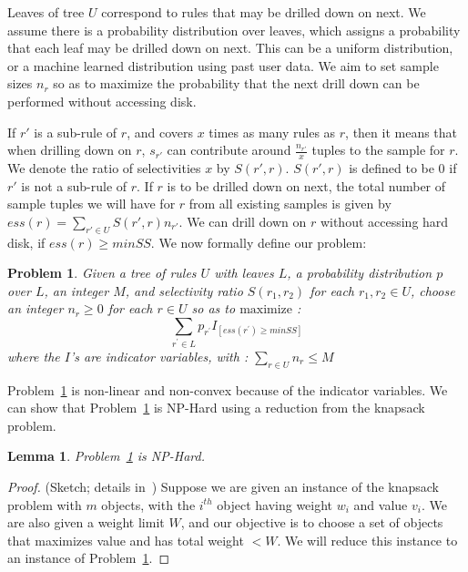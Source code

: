 \documentclass[10pt,journal,compsoc]{IEEEtran}
\newtheorem{lemma}{Lemma}
\newcounter{prob}
\newtheorem{problem}[prob]{Problem}
\begin{document}
{Leaves of tree $U$ correspond to rules that may be drilled down on next. We assume there is a probability distribution over leaves, which assigns a probability that each leaf may be drilled down on next. This can be a uniform distribution, or a machine learned distribution using past user data. We aim to set sample sizes $n_r$ so as to maximize the probability that the next drill down can be performed without accessing disk. 

If $r'$ is a sub-rule of $r$, and covers $x$ times as many rules as $r$, then it means that when drilling down on $r$, $s_{r'}$ can contribute around $\frac{n_{r'}}{x}$ tuples to the sample for $r$. We denote the ratio of selectivities $x$ by $S(r',r)$. $S(r',r)$ is defined to be $0$ if $r'$ is not a sub-rule of $r$. If $r$ is to be drilled down on next, the total number of sample tuples we will have for $r$ from all existing samples is given by $ess(r) = \sum_{r'\in U} S(r', r)n_{r'}$. We can drill down on $r$ without accessing hard disk, if $ess(r) \geq minSS$. We now formally define our problem: 

\begin{problem}\label{prob:sample-sizes}
Given a tree of rules $U$ with leaves $L$, a probability distribution $p$ over $L$, an integer $M$, and selectivity ratio $S(r_1, r_2)$ for each $r_1, r_2 \in U$, 
choose an integer $n_r \geq 0$ for each $r \in U$ so as to $\textrm{maximize}$ :
$$\sum_{r^{\prime} \in L} p_{r^{\prime}}I_{[ess(r^{\prime}) \geq minSS]}$$
where the $I$'s are indicator variables, with :
$\sum_{r \in U} n_r \leq M$
\end{problem}
Problem~\ref{prob:sample-sizes} is non-linear and non-convex because of the indicator variables. 
We can show that Problem~\ref{prob:sample-sizes} is {\sc NP-Hard} using a reduction from the knapsack problem. 
\begin{lemma}\label{lemma:sampling-hardness}
Problem~\ref{prob:sample-sizes} is {\sc NP-Hard}.
\end{lemma}
\begin{proof}(Sketch; details in~\cite{DBLP:journals/pvldb/JoglekarGP15})
Suppose we are given an instance of the knapsack problem with $m$ objects, with the $i^{th}$ object having weight $w_i$ and value $v_i$. We are also given a weight limit $W$, and our objective is to choose a set of objects that maximizes value and has total weight $< W$. We will reduce this instance to an instance of Problem~\ref{prob:sample-sizes}.


\end{proof}}
\end{document}
